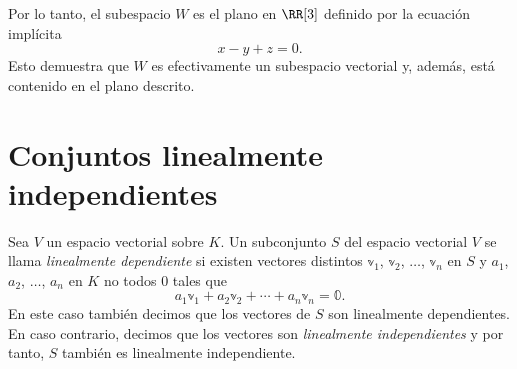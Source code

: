 \begin{examplebox}{}{}
\begin{center}
        \captionsetup*[figure]{hypcap=false}%
    \end{center}
    Por lo tanto, el subespacio $W$ es el plano en $\RR[3]$ definido por la ecuación implícita
    $$x - y + z = 0.$$
    Esto demuestra que $W$ es efectivamente un subespacio vectorial y, además, está contenido en el plano descrito.
\end{examplebox}

\newpage

\section{Conjuntos linealmente independientes}

\begin{definicion}{}{}
    Sea $V$ un espacio vectorial sobre $K$. Un subconjunto $S$ del espacio vectorial $V$ se llama \emph{linealmente dependiente} si existen vectores distintos $\mathbb{v}_1$, $\mathbb{v}_2$, $\dots$, $\mathbb{v}_n$ en $S$ y $a_1$, $a_2$, $\dots$, $a_n$ en $K$ no todos $0$ tales que
    $$a_1 \mathbb{v}_1 + a_2 \mathbb{v}_2 + \cdots + a_n \mathbb{v}_n = \mathbb{0}.$$
    En este caso también decimos que los vectores de $S$ son linealmente dependientes. En caso contrario, decimos que los vectores son \emph{linealmente independientes} y por tanto, $S$ también es linealmente independiente.
\end{definicion}

